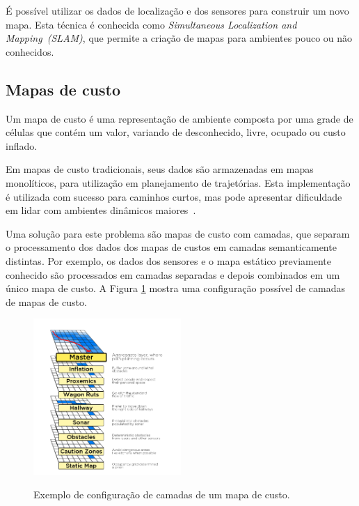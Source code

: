 \documentclass[repeatfields,xlists,xpacks,oneside,yearsonly]{ufrgscca}
\begin{document}
É possível utilizar os dados de localização e dos sensores para construir um novo mapa.
Esta técnica é conhecida como \textit{Simultaneous Localization and Mapping~(SLAM)},
que permite a criação de mapas para ambientes pouco ou não conhecidos.

\subsection{Mapas de custo}

Um mapa de custo é uma representação de ambiente composta por uma
grade de células que contém um valor, variando de desconhecido, livre,
ocupado ou custo inflado.

Em mapas de custo tradicionais, seus dados são armazenadas em mapas monolíticos,
para utilização em planejamento de trajetórias.
Esta implementação é utilizada com sucesso para caminhos curtos,
mas pode apresentar dificuldade em lidar com ambientes dinâmicos
maiores~\cite{layered_costmaps}.

Uma solução para este problema são mapas de custo com camadas,
que separam o processamento dos dados dos mapas de custos em camadas semanticamente distintas.
Por exemplo, os dados dos sensores e o mapa estático previamente conhecido são processados
em camadas separadas e depois combinados em um único mapa de custo.
A Figura \ref{fig:mapa_camadas} mostra uma configuração possível de camadas
de mapas de custo.

\begin{figure}[htbp]
    {
        \centering
        \caption{Exemplo de configuração de camadas de um mapa de custo.}
        \label{fig:mapa_camadas}
        \includegraphics[width=0.5\textwidth]{mapa_camadas.png}\\
    }
    {}
\end{figure}
\end{document}

